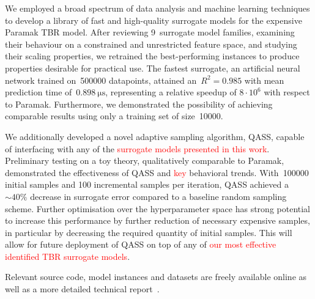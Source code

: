 We employed a broad spectrum of data
analysis and machine learning techniques to develop a library of fast and high-quality
surrogate models for the expensive Paramak TBR model. After reviewing
9~surrogate model families, examining their behaviour on a constrained and
unrestricted feature space, and studying their scaling properties, we retrained
the best-performing instances to produce properties desirable for
practical use. The fastest surrogate, an artificial neural network trained
on~\num{500000} datapoints, attained an~$R^2=\num{0.985}$ with mean prediction time
of~$\SI{0.898}{\micro\second}$, representing a relative
speedup of $8\cdot 10^6$ with respect to Paramak. Furthermore, we demonstrated the possibility of achieving comparable results using only a
training set of size~\num{10000}.

We additionally developed a novel adaptive
sampling algorithm, QASS, capable of interfacing with any of the \textcolor{red}{surrogate models presented in this work}.
Preliminary testing on a toy theory, qualitatively comparable to
Paramak, demonstrated the effectiveness of QASS and \textcolor{red}{key} behavioral trends. With~\num{100000} initial samples
and 100 incremental samples per iteration, QASS achieved a ${\sim}40\%$ decrease
in surrogate error compared to a baseline random sampling scheme. Further optimisation over the hyperparameter space has strong potential to increase this performance by further reduction of necessary expensive samples, in particular by decreasing the required quantity of initial samples. This will allow for future deployment of QASS on top of any of \textcolor{red}{our most effective identified TBR surrogate models}.

Relevant source code, model instances and datasets are freely
available online as well as a more detailed technical
report~\cite{github,finalreport}.
